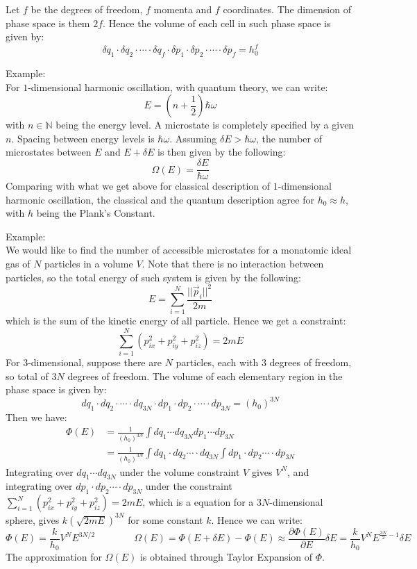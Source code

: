 \documentclass[11pt]{article}
\theoremstyle{break}
\theoremstyle{break}
\newcommand{\N}{\mathbb{N}}
\newcommand{\example}{\color{green}Example: \color{black}}
\begin{document}
\hfill\break
Let $f$ be the degrees of freedom, $f$ momenta and $f$ coordinates. The dimension of phase space is them $2f$. Hence the volume of each cell in such phase space is given by: $$\delta q_1 \cdot \delta q_2 \cdot \cdots \cdot \delta q_f \cdot \delta p_1 \cdot \delta p_2\cdot \cdots \cdot \delta p_f = h_0^f$$


\example\\
For $1$-dimensional harmonic oscillation, with quantum theory, we can write:
$$E = \left(n+\frac{1}{2}\right) \hbar \omega$$
with $n\in \N$ being the energy level. A microstate is completely specified by a given $n$. Spacing between energy levels is $\hbar \omega$. Assuming $\delta E > \hbar \omega$, the number of microstates between $E$ and $E+ \delta E$ is then given by the following: 
$$\Omega(E) = \frac{\delta E}{\hbar \omega}$$
Comparing with what we get above for classical description of $1$-dimensional harmonic oscillation, the classical and the quantum description agree for $h_0 \approx h$, with $h$ being the Plank's Constant. \\
\newpage


\example\\
We would like to find the number of accessible microstates for a monatomic ideal gas of $N$ particles in a volume $V$. Note that there is no interaction between particles, so the total energy of such system is given by the following:
$$E = \sum_{i=1}^N \frac{||\vec{p}_i||^2}{2m}$$ which is the sum of the kinetic energy of all particle. Hence we get a constraint:
$$\sum_{i=1}^N (p_{ix}^2 + p_{iy}^2 + p_{iz}^2) = 2mE$$
For $3$-dimensional, suppose there are $N$ particles, each with $3$ degrees of freedom, so total of $3N$ degrees of freedom. The volume of each elementary region in the phase space is given by:
$$dq_1\cdot dq_2 \cdot \cdots \cdot dq_{3N}\cdot dp_1\cdot dp_2\cdot \cdots \cdot dp_{3N} = (h_0)^{3N}$$
Then we have: 
\begin{align*}
\Phi(E) &= \frac{1}{(h_0)^{3N}}\int dq_{1} \cdots dq_{3N} dp_1 \cdots dp_{3N}\\
&= \frac{1}{(h_0)^{3N}} \int dq_1 \cdot dq_2 \cdots \cdot dq_{3N} \int dp_1 \cdot dp_2 \cdots \cdot dp_{3N}
\end{align*}
Integrating over $dq_{1} \cdots dq_{3N}$ under the volume constraint $V$ gives $V^N$, and integrating over $ dp_1 \cdot dp_2 \cdots \cdot dp_{3N}$ under the constraint $\sum_{i=1}^N (p_{ix}^2 + p_{iy}^2 + p_{iz}^2) = 2mE$, which is a equation for a $3N$-dimensional sphere, gives $k(\sqrt{2mE})^{3N}$ for some constant $k$. Hence we can write:
$$\Phi(E) = \frac{k}{h_0} V^N E^{3N/2} \qquad \qquad \Omega(E) = \Phi(E + \delta E) - \Phi(E) \approx \frac{\partial \Phi(E)}{\partial E} \delta E = \frac{k}{h_0} V^N E^{\frac{3N}{2}-1} \delta E$$
The approximation for $\Omega(E)$ is obtained through Taylor Expansion of $\Phi$. \\
\end{document}
